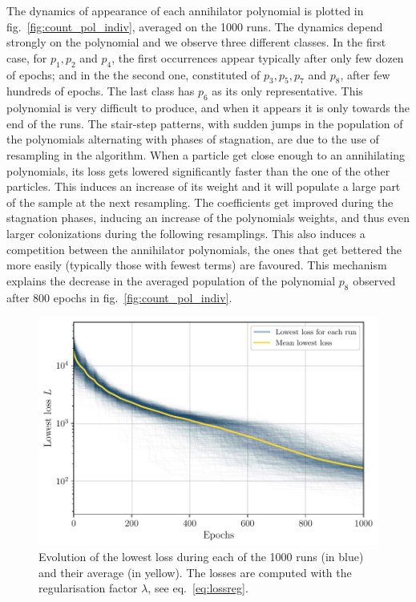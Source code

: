 \documentclass[11pt,a4paper]{article}
\begin{document}
	The dynamics of appearance of each annihilator polynomial is plotted in fig.~\ref{fig:count_pol_indiv}, averaged on the 1000 runs. The dynamics depend strongly on the polynomial and we observe three different classes. In the first case, for $p_{1}, p_{2}$ and $p_{4}$, the first occurrences appear typically after only few dozen of epochs; and in the the second one, constituted of $p_{3}, p_{5}, p_{7}$ and $p_{8}$, after few hundreds of epochs. The last class has $p_{6}$ as its only representative. This polynomial is very difficult to produce, and when it appears it is only towards the end of the runs. The stair-step patterns, with sudden jumps in the population of the polynomials alternating with phases of stagnation, are due to the use of resampling in the algorithm. When a particle get close enough to an annihilating polynomials, its loss gets lowered significantly faster than the one of the other particles. This induces an increase of its weight and it will populate a large part of the sample at the next resampling. The coefficients get improved during the stagnation phases, inducing an increase of the polynomials weights, and thus even larger colonizations during the following resamplings. This also induces a competition between the annihilator polynomials, the ones that get bettered the more easily (typically those with fewest terms) are favoured. This mechanism explains the decrease in the averaged population of the polynomial $p_{8}$ observed after 800 epochs in fig.~\ref{fig:count_pol_indiv}.

	\begin{figure}[b!]
		\centering
		\includegraphics[scale=0.75]{Figures/Loss_all_ASMC_1000runs_13.pdf}
		\caption{Evolution of the lowest loss during each of the 1000 runs (in blue) and their average (in yellow). The losses are computed with the regularisation factor $\lambda$, see eq.~\eqref{eq:lossreg}.}
		\label{fig:lossallASMC}
	\end{figure}
\end{document}
